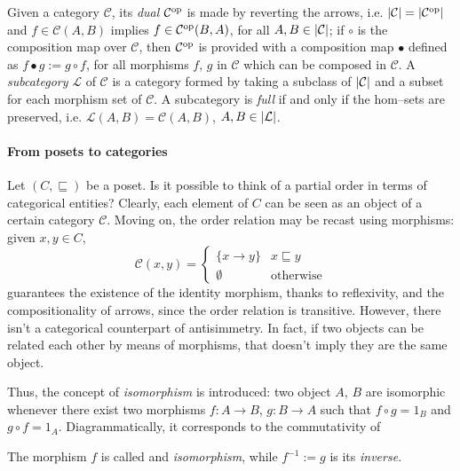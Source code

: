 Given a category \(\mathcal{C}\), its \emph{dual}
\(\mathcal{C}^\textup{op}\) is made by reverting the arrows, i.e.
\(\lvert \mathcal{C} \rvert = \lvert \mathcal{C}^\textup{op} \rvert\) and \(f \in%
\mathcal{C}(A,B)\) implies \(f \in \mathcal{C}^\textup{op}(B,A)\), for
all \(A,B \in \lvert \mathcal{C} \rvert\);
if \(\circ{}\) is the composition map over \(\mathcal{C}\), then
\(\mathcal{C}^\textup{op}\) is provided with a composition map
\(\bullet\) defined as \(f \bullet g := g \circ f\), for all morphisms %
\(f\), \(g\) in \(\mathcal{C}\) which can be composed in \(\mathcal{C}\). %
A \emph{subcategory} \(\mathcal{L}\) of \(\mathcal{C}\) is a category formed by taking a subclass of \(\lvert \mathcal{C} \rvert\) and a subset for each morphism set of \(\mathcal{C}\). %
A subcategory is \emph{full} if and only if the hom--sets are preserved, %
i.e. \(\mathcal{L}(A,B) = \mathcal{C}(A,B)\), \(A,B \in \lvert \mathcal{L} \rvert\).

\paragraph{From posets to categories} Let \((C,\sqsubseteq)\) be a poset. Is it possible to think of a partial order in terms of categorical entities?
Clearly, each element of \(C\) can be seen as an object of a certain category \(\mathcal{C}\). Moving on, the order relation may be recast using morphisms: given \(x, y \in C\),
\begin{equation*}
  \mathcal{C}(x,y) =
  \begin{cases}
    \lbrace x \to y \rbrace & x \sqsubseteq y \\ \emptyset & \text{otherwise}
  \end{cases}
\end{equation*}
guarantees the existence of the identity morphism, thanks to reflexivity, and the compositionality of arrows, since the order relation is transitive.
However, there isn't a categorical counterpart of antisimmetry.
In fact, if two objects can be related each other by means of morphisms, that doesn't imply they are the same object.

Thus, the concept of \emph{isomorphism} is introduced: two object \(A\), \(B\) are isomorphic whenever there exist two morphisms \(f \colon A \to B\), \(g \colon B \to A\) such that \(f \circ g = 1_B\) and \(g \circ f = 1_A\). Diagrammatically, it corresponds to the commutativity of
\begin{center}
\end{center}
The morphism \(f\) is called and \emph{isomorphism}, while \(f^{-1} := g\) is its \emph{inverse}.

